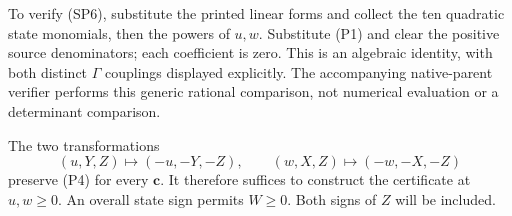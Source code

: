 To verify (SP6), substitute the printed linear forms and collect the
ten quadratic state monomials, then the powers of $u,w$. Substitute
(P1) and clear the positive source denominators; each coefficient is
zero. This is an algebraic identity, with both distinct $\Gamma$
couplings displayed explicitly. The accompanying native-parent
verifier performs this generic rational comparison, not numerical
evaluation or a determinant comparison.

The two transformations
\[
 (u,Y,Z)\mapsto(-u,-Y,-Z),\qquad
 (w,X,Z)\mapsto(-w,-X,-Z)
 \tag{SG}
\]
preserve (P4) for every $\mathbf c$. It therefore suffices to construct
the certificate at $u,w\ge0$. An overall state sign permits $W\ge0$.
Both signs of $Z$ will be included.

